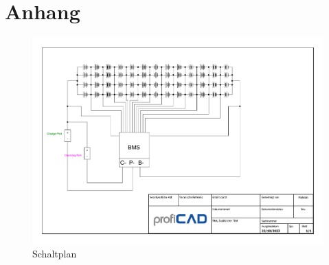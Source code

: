 

\chapter*{Anhang}
\begin{landscape}


\begin{figure}[h]
    \centering
    \includegraphics[width=22cm]{images/Schaltplan.pdf}
    \caption{Schaltplan\cite{LorenzScherrer.02.03.2024}}%
    \label{fig:5_1}
\end{figure}
\end{landscape}